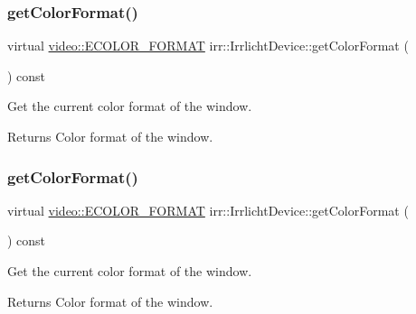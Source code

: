 \subsubsection{\texorpdfstring{get\+Color\+Format()}{getColorFormat()}\hspace{0.1cm}{\footnotesize\ttfamily [1/2]}}
{\footnotesize\ttfamily virtual \hyperlink{namespaceirr_1_1video_a1d5e487888c32b1674a8f75116d829ed}{video\+::\+E\+C\+O\+L\+O\+R\+\_\+\+F\+O\+R\+M\+AT} irr\+::\+Irrlicht\+Device\+::get\+Color\+Format (\begin{DoxyParamCaption}{ }\end{DoxyParamCaption}) const\hspace{0.3cm}{\ttfamily [pure virtual]}}



Get the current color format of the window. 

\begin{DoxyReturn}{Returns}
Color format of the window. 
\end{DoxyReturn}
\mbox{\label{classirr_1_1IrrlichtDevice_a9dccd3d7af7cfbabee46214a89bd6650}} 
\subsubsection{\texorpdfstring{get\+Color\+Format()}{getColorFormat()}\hspace{0.1cm}{\footnotesize\ttfamily [2/2]}}
{\footnotesize\ttfamily virtual \hyperlink{namespaceirr_1_1video_a1d5e487888c32b1674a8f75116d829ed}{video\+::\+E\+C\+O\+L\+O\+R\+\_\+\+F\+O\+R\+M\+AT} irr\+::\+Irrlicht\+Device\+::get\+Color\+Format (\begin{DoxyParamCaption}{ }\end{DoxyParamCaption}) const\hspace{0.3cm}{\ttfamily [pure virtual]}}



Get the current color format of the window. 

\begin{DoxyReturn}{Returns}
Color format of the window. 
\end{DoxyReturn}
\mbox{\label{classirr_1_1IrrlichtDevice_a500a3b7bf69487ff7e2075dd0b0db529}} 
